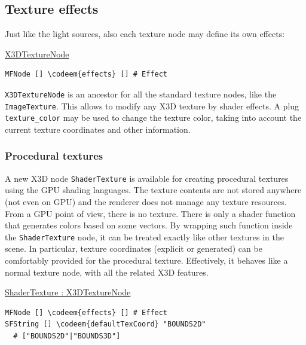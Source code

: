 \documentclass{egpubl}
\newenvironment{mycode}
{\begin{mycodecore}}
{\end{mycodecore}
\vspace{-0.1in}}
\newcommand*{\codeem}[1]{\textbf{#1}}
\begin{document}

\subsection{Texture effects}

Just like the light sources, also each texture node may define its own effects:

\begin{mycode}
\underline{X3DTextureNode}
\begin{Verbatim}[commandchars=\\\{\},fontsize=\small]
MFNode [] \codeem{effects} [] # Effect
\end{Verbatim}
\end{mycode}

\texttt{X3DTextureNode} is an ancestor for all the standard texture nodes,
like the \texttt{ImageTexture}. This allows to modify any X3D texture
by shader effects.
A plug \texttt{texture\_color} may be used to change the texture color,
taking into account the current texture coordinates and other information.

\subsubsection{Procedural textures}

A new X3D node \texttt{ShaderTexture} is available for creating
procedural textures using the GPU shading languages.
The texture contents are not stored anywhere (not even on GPU)
and the renderer does not manage any texture resources.
From a GPU point of view, there is no texture.
There is only a shader function that generates colors
based on some vectors. By wrapping such function inside
the \texttt{ShaderTexture} node, it can be treated exactly like other textures
in the scene. In particular, texture coordinates
(explicit or generated) can be comfortably provided
for the procedural texture.
Effectively, it behaves like a normal texture node, with all the related
X3D features.


\begin{mycode}
\underline{ShaderTexture : X3DTextureNode}
\begin{Verbatim}[commandchars=\\\{\},fontsize=\small]
MFNode [] \codeem{effects} [] # Effect
SFString [] \codeem{defaultTexCoord} "BOUNDS2D"
  # ["BOUNDS2D"|"BOUNDS3D"]
\end{Verbatim}
\end{mycode}
\end{document}
